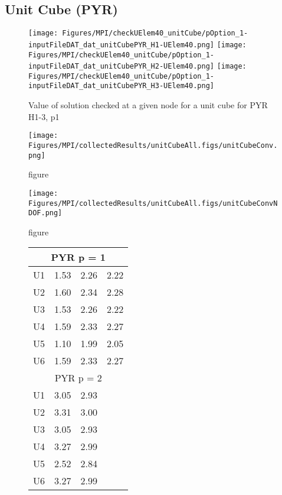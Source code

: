 \clearpage
\subsection{Unit Cube (PYR)}

\begin{figure}[!htb]
\texttt{[image: Figures/MPI/checkUElem40\_unitCube/pOption\_1-inputFileDAT\_dat\_unitCubePYR\_H1-UElem40.png]}
\texttt{[image: Figures/MPI/checkUElem40\_unitCube/pOption\_1-inputFileDAT\_dat\_unitCubePYR\_H2-UElem40.png]}
\texttt{[image: Figures/MPI/checkUElem40\_unitCube/pOption\_1-inputFileDAT\_dat\_unitCubePYR\_H3-UElem40.png]}
\caption{Value of solution checked at a given node for a unit cube for PYR H1-3, p1}
\end{figure}


\begin{figure}[!htb]
\texttt{[image: Figures/MPI/collectedResults/unitCubeAll.figs/unitCubeConv.png]}
\caption{figure}
\end{figure}

\begin{figure}[!htb]
\texttt{[image: Figures/MPI/collectedResults/unitCubeAll.figs/unitCubeConvNDOF.png]}
\caption{figure}
\end{figure}


\begin{figure}[!htb]
\begin{tabular}{| l || c | c | c |}
\hline
\multicolumn{4}{|c|}{PYR p = 1} \\
\hline
U1 & 1.53 & 2.26 & 2.22 \\
U2 & 1.60 & 2.34 & 2.28 \\
U3 & 1.53 & 2.26 & 2.22 \\
U4 & 1.59 & 2.33 & 2.27 \\
U5 & 1.10 & 1.99 & 2.05 \\
U6 & 1.59 & 2.33 & 2.27 \\
\hline
\hline
\multicolumn{4}{|c|}{PYR p = 2} \\
\hline
U1 & 3.05 & 2.93 & \\
U2 & 3.31 & 3.00 & \\
U3 & 3.05 & 2.93 & \\
U4 & 3.27 & 2.99 & \\
U5 & 2.52 & 2.84 & \\
U6 & 3.27 & 2.99 & \\
\hline   
\end{tabular}
\end{figure}

